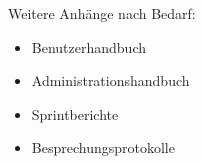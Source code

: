 \documentclass[
	papersize=A4,
	fontsize=12pt, 
	laterality=oneside, 
	draft=false,
	parskip=half,
	BCOR=0mm,
	linespread=1.15,
	language={american, ngerman},
	biblatex, %
	bibfile=99--references.bib,
	biblatexstyle=alphabetic,
	biblatexdashed=false,  %
	biblatexbackref=true,  %
	bibtexstyle=alpha, 
	dispositioncolor={30,103,182},
	colorlinks=true, %
    titlepage=titlepage,
	todonotesoptions={color=Dandelion,bordercolor=white},
	addcolophon=false, %
	addlistoftodos=false, %
]{longdoc}
\begin{document}










% 

\appendix


\LDinsertbibliography

\listoffigures

\listoftables









Weitere Anhänge nach Bedarf:

\begin{itemize}
\item Benutzerhandbuch
\item Administrationshandbuch
\item Sprintberichte
\item  Besprechungsprotokolle
\end{itemize}
\end{document}
